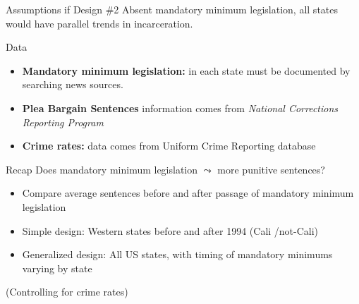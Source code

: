 \documentclass[11pt]{beamer}
\begin{document}
\begin{frame}[c]{Assumptions if Design \#2}
Absent mandatory minimum legislation, all states would have parallel trends in incarceration.
\end{frame}

\begin{frame}[c]{Data}
    \begin{itemize}
        \item \textbf{Mandatory minimum legislation:} in each state must be documented by searching news sources.
        \item \textbf{Plea Bargain Sentences} information comes from \emph{National Corrections Reporting Program}
        \item \textbf{Crime rates:} data comes from Uniform Crime Reporting database
    \end{itemize}
\end{frame}

\begin{frame}[c]{Recap}
    \alert{Does mandatory minimum legislation $\leadsto$ more punitive sentences?}
    \begin{itemize}
        \item Compare average sentences before and after passage of mandatory minimum legislation
        \pause \item Simple design: Western states before and after 1994 (Cali /not-Cali)
        \pause \item Generalized design: All US states, with timing of mandatory minimums varying by state
    \end{itemize}
    (Controlling for crime rates)
\end{frame}
\end{document}

